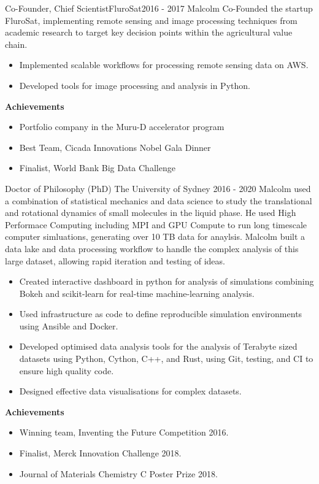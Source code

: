 \begin{cventry}{Co-Founder, Chief Scientist}{FluroSat}{}{2016 - 2017}
  Malcolm Co-Founded the startup FluroSat, 
  implementing remote sensing and image processing techniques 
  from academic research to target key decision points 
  within the agricultural value chain.
  \begin{itemize}
    \item Implemented scalable workflows for processing remote sensing data on AWS.
    \item Developed tools for image processing and analysis in Python.
    \end{itemize}
  \textbf{Achievements}
  \begin{itemize}
      \item Portfolio company in the Muru-D accelerator program
      \item Best Team, Cicada Innovations Nobel Gala Dinner
      \item Finalist, World Bank Big Data Challenge
  \end{itemize}
\end{cventry}



\begin{cventry}
  {Doctor of Philosophy (PhD)} %
  {The University of Sydney} %
  {} %
  {2016 - 2020} %
  Malcolm used a combination of statistical mechanics and data science to
  study the translational and rotational dynamics
  of small molecules in the liquid phase.
  He used High Performace Computing
  including MPI and GPU Compute
  to run long timescale computer simluations,
  generating over 10 TB data for anaylsis.
  Malcolm built a data lake and data processing workflow
  to handle the complex analysis of this large dataset,
  allowing rapid iteration and testing of ideas.
  \begin{itemize}
    \item Created interactive dashboard in python for analysis of simulations
      combining Bokeh and scikit-learn for real-time machine-learning analysis.
    \item Used infrastructure as code to define reproducible simulation environments
      using Ansible and Docker.
    \item Developed optimised data analysis tools for the analysis of Terabyte sized
      datasets using Python, Cython, C++, and Rust,
      using Git, testing, and CI to ensure high quality code.
    \item Designed effective data visualisations for complex datasets.
  \end{itemize}
  \textbf{Achievements}
  \begin{itemize}
    \item Winning team, Inventing the Future Competition 2016.
    \item Finalist, Merck Innovation Challenge 2018.
    \item Journal of Materials Chemistry C Poster Prize 2018.
  \end{itemize}
\end{cventry}

